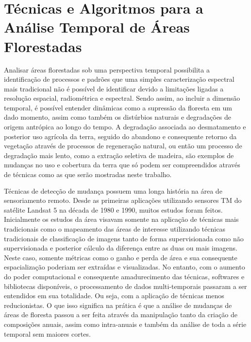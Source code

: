 \documentclass{article}
\begin{document}
\section{Técnicas e Algoritmos para a Análise Temporal de Áreas Florestadas}
Analisar áreas florestadas sob uma perspectiva temporal possibilita a identificação de processos e padrões que uma simples caracterização espectral mais tradicional não é possível de identificar devido a limitações ligadas a resolução espacial, radiométrica e espectral. Sendo assim, ao incluir a dimensão temporal, é possível entender dinâmicas como a supressão da floresta em um dado momento, assim como também os distúrbios naturais e degradações de origem antrópica ao longo do tempo.
A degradação associada ao desmatamento e posterior uso agrícola da terra, seguido do abandono e consequente retorno da vegetação através de processos de regeneração natural, ou então um processo de degradação mais lento, como a extração seletiva de madeira, são exemplos de mudanças no uso e cobertura da terra que só podem ser compreendidos através de técnicas como as que serão mostradas neste trabalho. 
\par
Técnicas de detecção de mudança possuem uma longa história na área de sensoriamento remoto. Desde as primeiras aplicações utilizando sensores TM do satélite Landsat 5 na década de 1980 e 1990, muitos estudos foram feitos. Inicialmente os estudos da área visavam somente na aplicação de técnicas mais tradicionais como o mapeamento das áreas de interesse utilizando técnicas tradicionais de classificação de imagens tanto de forma supervisionada como não supervisionada e posterior cálculo da diferença entre as duas ou mais imagens. Neste caso, somente métricas como o ganho e perda de área e sua consequente espacialização poderiam ser extraídas e visualizadas. No entanto, com o aumento do poder computacional e consequente amadurecimento das técnicas, softwares e bibliotecas disponíveis, o processamento de dados multi-temporais passaram a ser entendidos em sua totalidade. Ou seja, com a aplicação de técnicas menos reducionistas. O que isso significa na prática é que a análise de mudanças de áreas de floresta passou a ser feita através da manipulação tanto da criação de composições anuais, assim como intra-anuais e também da análise de toda a série temporal sem maiores cortes.
\par
\end{document}
